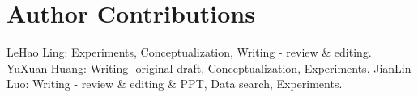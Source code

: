 \section*{Author Contributions}
LeHao Ling: Experiments, Conceptualization, Writing - review \& editing.
YuXuan Huang: Writing- original draft, Conceptualization, Experiments.
JianLin Luo: Writing - review \& editing \& PPT, Data search, Experiments.
